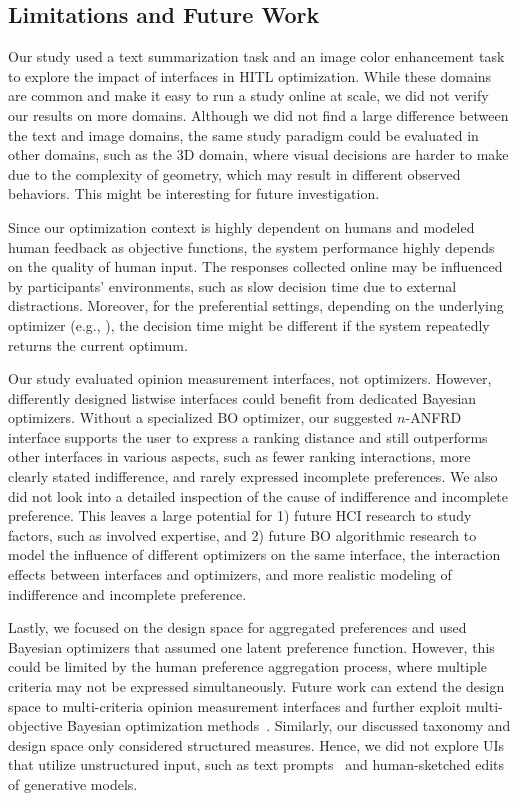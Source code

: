 \documentclass[acmsmall,screen,nonacm]{acmart}
\begin{document}
\subsection{Limitations and Future Work}
Our study used a text summarization task and an image color enhancement task to explore the impact of interfaces in HITL optimization. While these domains are common and make it easy to run a study online at scale, we did not verify our results on more domains. Although we did not find a large difference between the text and image domains, the same study paradigm could be evaluated in other domains, such as the 3D domain, where visual decisions are harder to make due to the complexity of geometry, which may result in different observed behaviors. This might be interesting for future investigation.

Since our optimization context is highly dependent on humans and modeled human feedback as objective functions, the system performance highly depends on the quality of human input. The responses collected online may be influenced by participants’ environments, such as slow decision time due to external distractions. Moreover, for the preferential settings, depending on the underlying optimizer (e.g., \citet{brochu2007active}), the decision time might be different if the system repeatedly returns the current optimum.

Our study evaluated opinion measurement interfaces, not optimizers. However, differently designed listwise interfaces could benefit from dedicated Bayesian optimizers. Without a specialized BO optimizer, our suggested $n$-ANFRD interface supports the user to express a ranking distance and still outperforms other interfaces in various aspects, such as fewer ranking interactions, more clearly stated indifference, and rarely expressed incomplete preferences. We also did not look into a detailed inspection of the cause of indifference and incomplete preference. This leaves a large potential for 1) future HCI research to study factors, such as involved expertise, and 2) future BO algorithmic research to model the influence of different optimizers on the same interface, the interaction effects between interfaces and optimizers, and more realistic modeling of indifference and incomplete preference.

Lastly, we focused on the design space for aggregated preferences and used Bayesian optimizers that assumed one latent preference function. However, this could be limited by the human preference aggregation process, where multiple criteria may not be expressed simultaneously. Future work can extend the design space to multi-criteria opinion measurement interfaces and further exploit multi-objective Bayesian optimization methods~\cite{benavoli2021choice, daulton2020differentiable}. Similarly, our discussed taxonomy and design space only considered structured measures. Hence, we did not explore UIs that utilize unstructured input, such as text prompts~\cite{dang2022prompt} and human-sketched edits~\cite{chong2021interactive} of generative models.
\end{document}
